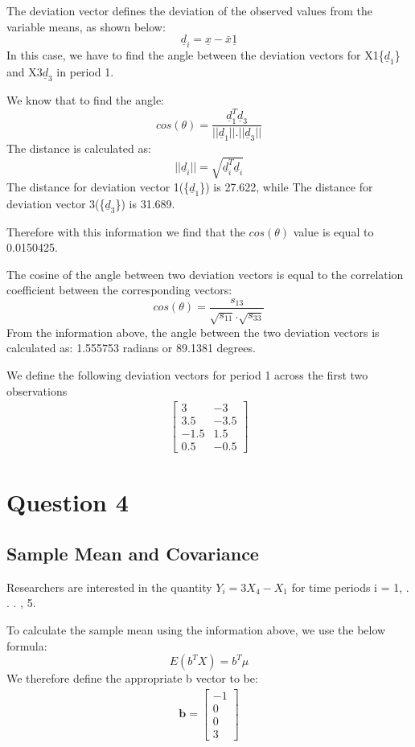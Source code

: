 \documentclass[
]{article}
\begin{document}
The deviation vector defines the deviation of the observed values from
the variable means, as shown below: \[
\underline{d}_{i} = \underline{x} - \bar{x}\underline{1}
\] In this case, we have to find the angle between the deviation vectors
for X1\{\(\underline{d}_{1}\)\} and X3\(\underline{d}_{3}\) in period 1.

We know that to find the angle: \[
cos(\theta) = \frac{\underline{d}_{1}^{T}\underline{d}_{3}}{||\underline{d}_{1}||.||\underline{d}_{3}||}
\] The distance is calculated as: \[
||\underline{d}_{i}|| =  \sqrt{\underline{d}_{i}^{T}\underline{d}_{i}}
\] The distance for deviation vector 1(\{\(\underline{d}_{1}\)\}) is
27.622, while The distance for deviation vector
3(\{\(\underline{d}_{3}\)\}) is 31.689.

Therefore with this information we find that the \(cos(\theta)\) value
is equal to 0.0150425.

The cosine of the angle between two deviation vectors is equal to the
correlation coefficient between the corresponding vectors: \[
cos(\theta) = \frac{s_{13}}{\sqrt{s_{11}}.\sqrt{s_{33}}}
\] From the information above, the angle between the two deviation
vectors is calculated as: 1.555753 radians or 89.1381 degrees.

We define the following deviation vectors for period 1 across the first
two observations \begin{align}
\begin{bmatrix} 
  3 & -3  \\
  3.5 & -3.5 \\
  -1.5 & 1.5 \\
  0.5 & -0.5
\end{bmatrix}
\end{align}

\section{Question 4}
\subsection{Sample Mean and Covariance}

Researchers are interested in the quantity \(Y_{i} = 3X_{4} − X_{1}\)
for time periods i = 1, . . . , 5.

To calculate the sample mean using the information above, we use the
below formula: \[
E(b^{T}X) = b^{T}\mu
\] We therefore define the appropriate b vector to be: \begin{align}
\mathbf{b} = \begin{bmatrix} -1\\0\\0\\3 \end{bmatrix}
\end{align}
\end{document}
